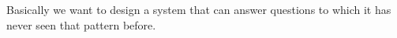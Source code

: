 \documentclass{article}
\begin{document}

Basically we want to design a system that can answer questions to which it has never seen that pattern before.
\end{document}
